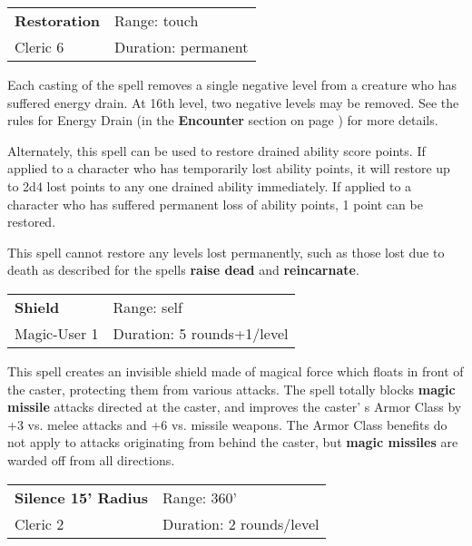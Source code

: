 \documentclass[a4paper,twoside,openany,10pt]{book}
\begin{document}
\begin{multicols}{2}
\smallskip\begin{flushleft} 
	\begin{tabularx}{0.45\textwidth}{@{}m{3.5cm}m{5.5cm}@{}} 
		\textbf{Restoration} & Range: touch\\
Cleric 6 &Duration: permanent\\
	\end{tabularx}\end{flushleft}

Each casting of the spell removes a single negative level from a creature who has suffered energy drain. At 16th level, two negative levels may be removed. See the rules for Energy Drain (in the \textbf{Encounter} section on page \hyperlink{energy-drain}{\pageref{energy-drain}}) for more details.

Alternately, this spell can be used to restore drained ability score points. If applied to a character who has temporarily lost ability points, it will restore up to 2d4 lost points to any one drained ability immediately. If applied to a character who has suffered permanent loss of ability points, 1 point can be restored.

This spell cannot restore any levels lost permanently, such as those lost due to death as described for the spells \textbf{raise dead} and \textbf{reincarnate}.

\smallskip\begin{flushleft} 
	\begin{tabularx}{0.45\textwidth}{@{}m{3.5cm}m{5.5cm}@{}} 
		\textbf{Shield} & Range: self\\
Magic-User 1 & Duration: 5 rounds+1/level\\
	\end{tabularx}\end{flushleft}

This spell creates an invisible shield made of magical force which floats in front of the caster, protecting them from various attacks. The spell totally blocks \textbf{magic missile} attacks directed at the caster, and improves the caster' s Armor Class by +3 vs. melee attacks and +6 vs. missile weapons. The Armor Class benefits do not apply to attacks originating from behind the caster, but \textbf{magic missiles} are warded off from all directions.

\smallskip\begin{flushleft} 
	\begin{tabularx}{0.45\textwidth}{@{}m{3.5cm}m{5.5cm}@{}} 
		\textbf{Silence 15' Radius} & Range: 360'\\
Cleric 2 & Duration: 2 rounds/level\\
	\end{tabularx}\end{flushleft}


\end{multicols}
\end{document}
